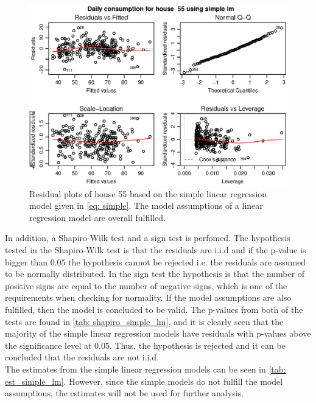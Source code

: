 \begin{figure}
    \centering
    \includegraphics[width=1.\textwidth]{../../../figures/simple_lm55.eps}
    \caption{Residual plots of house 55 based on the simple linear regression model given in \cref{eq: simple}. The model assumptions of a linear regression model are overall fulfilled.}
    \label{fig: simple_lm_55}
\end{figure}
In addition, a Shapiro-Wilk test and a sign test is perfomed. The hypothesis tested in the Shapiro-Wilk test is that the residuals are i.i.d and if the p-value is bigger than $0.05$ the hypothesis cannot be rejected i.e. the residuals are assumed to be normally distributed. In the sign test the hypothesis is that the number of positive signs are equal to the number of negative signs, which is one of the requirements when checking for normality. If the model assumptions are also fulfilled, then the model is concluded to be valid. The p-values from both of the tests are found in \cref{tab: shapiro_simple_lm}, and it is clearly seen that the majority of the simple linear regression models have residuals with p-values above the significance level at 0.05. Thus, the hypothesis is rejected and it can be concluded that the residuals are not i.i.d. \\
\noindent The estimates from the simple linear regression models can be seen in \cref{tab: est_simple_lm}. However, since the simple models do not fulfill the model assumptions, the estimates will not be used for further analysis. 
